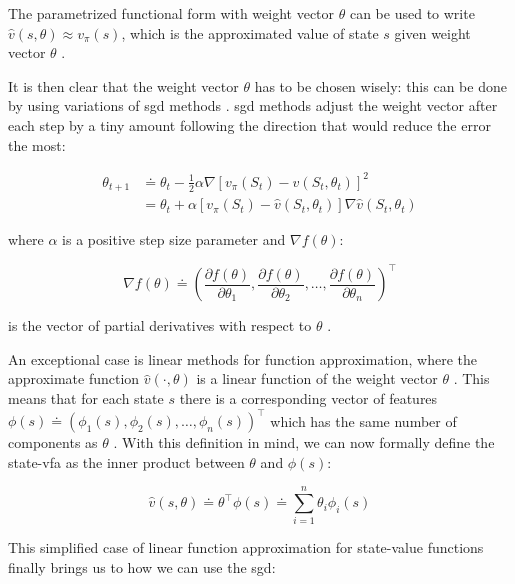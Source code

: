 \documentclass{seal_thesis}
\begin{document}
The parametrized functional form with weight vector $\theta$ can be used to write $\hat{v}(s,\theta) \approx v_\pi (s)$, which is the approximated value of state $s$ given weight vector $\theta$ \cite[p. 191]{Sutton2017}.

It is then clear that the weight vector $\theta$ has to be chosen wisely: this can be done by using variations of \gls{sgd} methods \cite[p. 223]{Sutton2017}. \gls{sgd} methods adjust the weight vector after each step by a tiny amount following the direction that would reduce the error the most:

\begin{align}
	\theta_{t+1} &\doteq \theta_t - \frac{1}{2} \alpha \nabla [v_\pi (S_t) - \hat{v} (S_t,\theta_t)]^2\\
	&= \theta_t + \alpha  [v_\pi (S_t) - \hat{v} (S_t,\theta_t)] \nabla \hat{v} (S_t,\theta_t)
\end{align}

where $\alpha$ is a positive step size parameter and $\nabla f(\theta)$:

\begin{equation}
	\nabla f(\theta) \doteq \left( \frac{\partial f(\theta)}{\partial \theta_1}, \frac{\partial f(\theta)}{\partial \theta_2}, \ldots, \frac{\partial f(\theta)}{\partial \theta_n} \right)^\top
\end{equation}

is the vector of partial derivatives with respect to $\theta$ \cite[p. 195]{Sutton2017}.

An exceptional case is linear methods for function approximation, where the approximate function $\hat{v} (\cdot ,\theta)$ is a linear function of the weight vector $\theta$ \cite[p. 198]{Sutton2017}. This means that for each state $s$ there is a corresponding vector of features $\phi (s) \doteq \left( \phi_1 (s), \phi_2 (s), \ldots, \phi_n (s) \right)^\top$ which has the same number of components as $\theta$ \cite[p. 198]{Sutton2017}. With this definition in mind, we can now formally define the state-\gls{vfa} as the inner product between $\theta$ and $\phi (s)$:

\begin{equation}
\label{eq:function_approximation_dot}
	\hat{v} (s,\theta) \doteq \theta^\top \phi (s) \doteq \sum_{i=1}^n \theta_i \phi_i (s)
\end{equation}

This simplified case of linear function approximation for state-value functions finally brings us to how we can use the \gls{sgd}:
\end{document}
